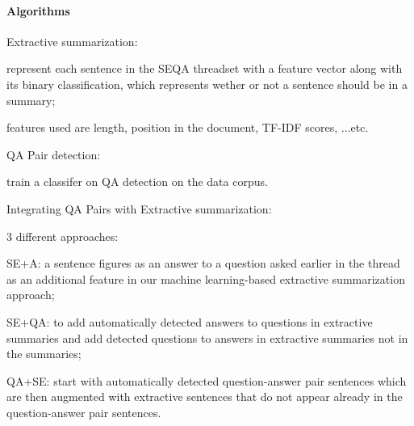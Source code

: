 \paragraph{Algorithms}
\begin{my_itemize}
  \item Extractive summarization:
  \begin{my_itemize}
    \item represent each sentence in the SEQA threadset with a feature vector 
	  along with its binary classification, which represents wether or not a
	  sentence should be in a summary;
    \item features used are length, position in the document, TF-IDF scores, ...etc.
  \end{my_itemize}
  \item QA Pair detection:
  \begin{my_itemize}
    \item train a classifer on QA detection on the data corpus.
  \end{my_itemize}
  \item Integrating QA Pairs with Extractive summarization:
  \begin{my_itemize}
    \item 3 different approaches:
    \begin{my_itemize}
      \item SE+A: a sentence figures as an answer to a question asked earlier 
	    in the thread as an additional feature in our machine learning-based 
	    extractive summarization approach;
      \item SE+QA: to add automatically detected answers to questions in 
	    extractive summaries and add detected questions to answers in extractive 
	    summaries not in the summaries;
      \item QA+SE: start with automatically detected question-answer pair sentences 
	    which are then augmented with extractive sentences that do not 
	    appear already in the question-answer pair sentences.
    \end{my_itemize}
  \end{my_itemize}
\end{my_itemize}



